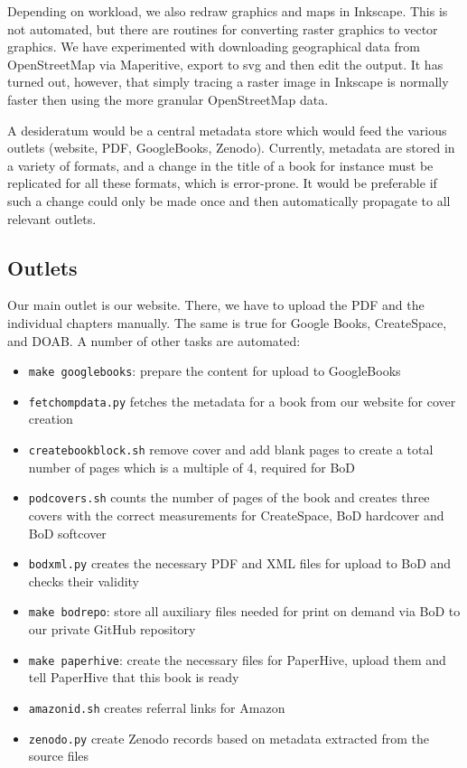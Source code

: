 \documentclass[nonflat,modfonts,output=book] {langsci/langscibook}
\begin{document}
Depending on workload, we also redraw graphics and maps in Inkscape. This is not automated, but there are routines for converting raster graphics to vector graphics. We have experimented with downloading geographical data from OpenStreetMap via Maperitive, export to svg and then edit the output. It has turned out, however, that simply tracing a raster image in Inkscape is normally faster then using the more granular OpenStreetMap data. 

A desideratum would be a central metadata store which would feed the various outlets (website, PDF, GoogleBooks, Zenodo). Currently, metadata are stored in a variety of formats, and a change in the title of a book for instance must be replicated for all these formats, which is error-prone. It would be preferable if such a change could only be made once and then automatically propagate to all relevant outlets.

\subsection{Outlets}
Our main outlet is our website. There, we have to upload the PDF and the individual chapters manually. The same is true for Google Books, CreateSpace, and DOAB. A number of other tasks are automated:

\begin{itemize}
 \item \texttt{make googlebooks}: prepare the content for upload to GoogleBooks 
 \item \texttt{fetchompdata.py} fetches the metadata for a book from our website for cover creation 
 \item \texttt{createbookblock.sh} remove cover and add blank pages to create a total number of pages which is a multiple of 4, required for BoD
 \item \texttt{podcovers.sh} counts the number of pages of the book and creates three covers with the correct measurements for CreateSpace, BoD hardcover and BoD softcover 
 \item \texttt{bodxml.py} creates the necessary PDF and XML files for upload to BoD and checks their validity
 \item \texttt{make bodrepo}: store all auxiliary files needed for print on demand via BoD to our private GitHub repository
 \item \texttt{make paperhive}: create the necessary files for PaperHive, upload them and tell PaperHive that this book is ready 
 \item \texttt{amazonid.sh} creates referral links for Amazon
 \item \texttt{zenodo.py} create Zenodo records based on metadata extracted from the source files 
\end{itemize}
 
\end{document}

